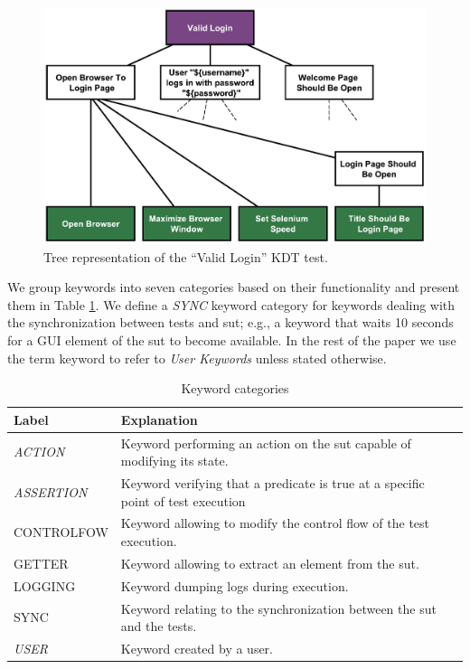 \begin{figure}
\centering
\includegraphics[width=0.7\columnwidth]{figures/evolution/robotframework_tree.pdf}
\caption{Tree representation of the ``Valid Login'' KDT test.}
\label{fig:robotframework_tree}
\end{figure}

We group keywords into seven categories based on their functionality and present them in Table \ref{keywords_categories}. We define a \emph{SYNC} keyword category for keywords dealing with the synchronization between tests and \gls{sut}; e.g., a keyword that waits 10 seconds for a GUI element of the \gls{sut} to become available. In the rest of the paper we use the term keyword to refer to \emph{User Keywords} unless stated otherwise.

\begin{table}
\caption{Keyword categories}
\label{keywords_categories}
\centering
\begin{tabular}{>{\raggedright}m{0.9in}>{\raggedright}m{4in}}
\toprule
\textbf{\scriptsize{Label}} & \textbf{\scriptsize{Explanation}}\tabularnewline
\toprule

\scriptsize{\textit{ACTION}} & \scriptsize{Keyword performing an action on the
\gls{sut} capable of modifying its state.} \tabularnewline

\scriptsize{\textit{ASSERTION}} & \scriptsize{Keyword verifying that a predicate
is true at a specific point of test execution} \tabularnewline

\scriptsize{CONTROLFOW} & \scriptsize{Keyword allowing to modify the
                                   control flow of the test execution.} \tabularnewline

\scriptsize{GETTER} & \scriptsize{Keyword allowing to extract an element from
the \gls{sut}.} \tabularnewline

\scriptsize{LOGGING} & \scriptsize{Keyword dumping logs during execution.}
\tabularnewline

\scriptsize{SYNC} & \scriptsize{Keyword relating to the
                                  synchronization between the \gls{sut} and the tests.} \tabularnewline

\scriptsize{\textit{USER}} & \scriptsize{Keyword created by a user.}
\tabularnewline

\bottomrule
\end{tabular}
\end{table}


